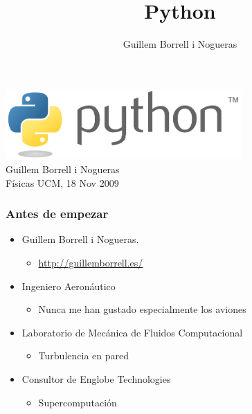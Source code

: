 \documentclass[12pt,mathserif,compress]{beamer}
\title{Python}
\author{Guillem Borrell i Nogueras}
\begin{document}

\begin{frame}
\begin{center}
 \includegraphics[width=9cm]{files/python-logo-generic.pdf}\\
\vspace{1cm}
Guillem Borrell i Nogueras\\

Físicas UCM, 18 Nov 2009
\end{center}

\end{frame}

\begin{frame}
  \frametitle{Antes de empezar}
  \begin{itemize}
  \item Guillem Borrell i Nogueras.
    \begin{itemize}
    \item  \url{http://guillemborrell.es/}
    \end{itemize}
  \item Ingeniero Aeronáutico
    \begin{itemize}
    \item Nunca me han gustado especialmente los aviones
    \end{itemize}
  \item Laboratorio de Mecánica de Fluidos Computacional
    \begin{itemize}
    \item Turbulencia en pared
    \end{itemize}
  \item Consultor de Englobe Technologies
    \begin{itemize}
    \item Supercomputación
    \end{itemize}
  \end{itemize}
\end{frame}
\end{document}
